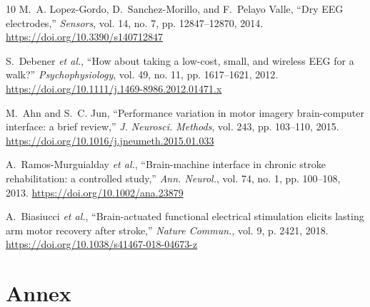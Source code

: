 \documentclass[preprint,12pt]{elsarticle}
\begin{document}
\begin{thebibliography}{10}
M.~A. Lopez-Gordo, D.~Sanchez-Morillo, and F.~Pelayo Valle, ``Dry EEG electrodes,'' \emph{Sensors}, vol. 14, no. 7, pp. 12847--12870, 2014. \url{https://doi.org/10.3390/s140712847}

S.~Debener \emph{et al.}, ``How about taking a low-cost, small, and wireless EEG for a walk?'' \emph{Psychophysiology}, vol. 49, no. 11, pp. 1617--1621, 2012. \url{https://doi.org/10.1111/j.1469-8986.2012.01471.x}

M.~Ahn and S.~C. Jun, ``Performance variation in motor imagery brain-computer interface: a brief review,'' \emph{J. Neurosci. Methods}, vol. 243, pp. 103--110, 2015. \url{https://doi.org/10.1016/j.jneumeth.2015.01.033}

A.~Ramos-Murguialday \emph{et al.}, ``Brain-machine interface in chronic stroke rehabilitation: a controlled study,'' \emph{Ann. Neurol.}, vol. 74, no. 1, pp. 100--108, 2013. \url{https://doi.org/10.1002/ana.23879}

A.~Biasiucci \emph{et al.}, ``Brain-actuated functional electrical stimulation elicits lasting arm motor recovery after stroke,'' \emph{Nature Commun.}, vol. 9, p. 2421, 2018. \url{https://doi.org/10.1038/s41467-018-04673-z}

\end{thebibliography}

\section{Annex}
\end{document}
